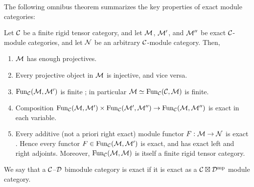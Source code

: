 \documentclass{amsart}
\begin{document}
The following omnibus theorem summarizes the key properties of exact module categories: 
\begin{theorem} \label{Thm:ExactModCatOmnibus}
	Let $\mathcal C$ be a finite rigid tensor category, and let $\mathcal M$, $\mathcal M'$, and $\mathcal M''$ be exact $\mathcal C$-module categories, and let $\mathcal N$ be an arbitrary $\mathcal C$-module category. Then,
	\begin{enumerate}
		\item $\mathcal M$ has enough projectives. \cite[Lemma 2.7.1]{EGNO}
		\item Every projective object in $\mathcal M$  is injective, and vice versa. \cite[Cor 2.7.4]{EGNO}
		\item $\operatorname{Fun}_{\mathcal C}(\mathcal M, \mathcal M')$ is finite \cite[Prop 2.13.5]{EGNO}; in particular $\mathcal M \simeq \operatorname{Fun}_{\mathcal C}(\mathcal C, \mathcal M)$ is finite.
		\item Composition $\operatorname{Fun}_{\mathcal C}(\mathcal M, \mathcal M') \times \operatorname{Fun}_{\mathcal C}(\mathcal M', \mathcal M'') \to \operatorname{Fun}_{\mathcal C}(\mathcal M, \mathcal M'')$ is exact in each variable. \cite[Lemma 2.13.2]{EGNO}		
		\item Every additive (not a priori right exact) module functor $F:\mathcal M \to \mathcal N$ is exact \cite[Prop 2.7.8]{EGNO}. Hence every functor $F \in \operatorname{Fun}_{\mathcal C}(\mathcal M, \mathcal M')$ is exact, and has exact left and right adjoints. Moreover, $\operatorname{Fun}_{\mathcal C}(\mathcal M,\mathcal M)$ is itself a finite rigid tensor category. 
	\end{enumerate}
\end{theorem}

\begin{definition}
We say that a $\mathcal C$--$\mathcal D$ bimodule category is exact if it is exact as a $\mathcal C \boxtimes \mathcal D^{\mathrm{mp}}$ module category.
\end{definition}
\end{document}
